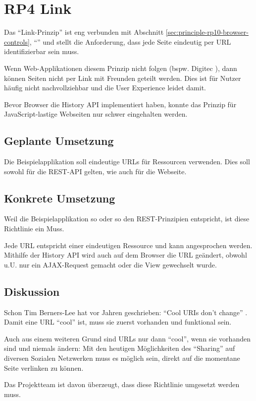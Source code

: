\section{RP4 Link}
\label{sec:principle-rp4-link}

Das ``Link-Prinzip'' ist eng verbunden mit Abschnitt \ref{sec:principle-rp10-browser-controls}, ``'' und stellt die Anforderung, dass jede Seite eindeutig per \gls{URL} identifizierbar sein muss.

Wenn Web-Applikationen diesem Prinzip nicht folgen (bspw. Digitec \cite{Digitec}), dann können Seiten nicht per Link mit Freunden geteilt werden.
Dies ist für Nutzer häufig nicht nachvollziehbar und die User Experience leidet damit.

Bevor Browser die History API \cite{HistoryAPI} implementiert haben, konnte das Prinzip für JavaScript-lastige Webseiten nur schwer eingehalten werden.

\subsection*{Geplante Umsetzung}
Die Beispielapplikation soll eindeutige URLs für Ressourcen verwenden. Dies soll sowohl für die REST-API gelten, wie auch für die Webseite.

\subsection*{Konkrete Umsetzung}
Weil die Beispielapplikation so oder so den \gls{REST}-Prinzipien entspricht, ist diese Richtlinie ein Muss.

Jede URL entspricht einer eindeutigen Ressource und kann angesprochen werden.
Mithilfe der History API \cite{HistoryAPI} wird auch auf dem Browser die URL
geändert, obwohl u.U. nur ein AJAX-Request gemacht oder die View gewechselt wurde.

\subsection*{Diskussion}
Schon Tim Berners-Lee hat vor Jahren geschrieben: ``Cool URIs don't change'' \cite{CoolURIsTBL}.
Damit eine URL ``cool'' ist, muss sie zuerst vorhanden und funktional sein.

Auch aus einem weiteren Grund sind URLs nur dann ``cool'', wenn sie vorhanden sind
und niemals ändern: Mit den heutigen Möglichkeiten des ``Sharing'' auf diversen Sozialen
Netzwerken muss es möglich sein, direkt auf die momentane Seite verlinken zu können.

Das Projektteam ist davon überzeugt, dass diese Richtlinie umgesetzt werden muss.